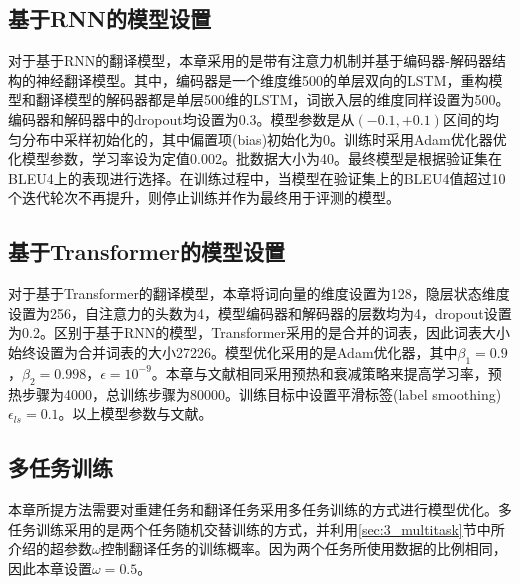 \subsection{基于RNN的模型设置}
\label{sec:3_rnn_setup}
对于基于RNN的翻译模型，本章采用的是带有注意力机制并基于编码器-解码器结构的神经翻译模型\cite{4_luong-etal-2015-effective}。其中，编码器是一个维度维500的单层双向的LSTM，重构模型和翻译模型的解码器都是单层500维的LSTM，词嵌入层的维度同样设置为500。编码器和解码器中的dropout均设置为0.3。模型参数是从$(-0.1,+0.1)$区间的均匀分布中采样初始化的，其中偏置项(bias)初始化为0。训练时采用Adam\cite{34_DBLP:journals/corr/KingmaB14}优化器优化模型参数，学习率设为定值0.002。批数据大小为40。最终模型是根据验证集在BLEU4\cite{42_papineni-etal-2002-bleu}上的表现进行选择。在训练过程中，当模型在验证集上的BLEU4值超过10个迭代轮次不再提升，则停止训练并作为最终用于评测的模型。

\subsection{基于Transformer的模型设置}
\label{sec:3_transformer_setup}
对于基于Transformer的翻译模型，本章将词向量的维度设置为128，隐层状态维度设置为256，自注意力的头数为4，模型编码器和解码器的层数均为4，dropout设置为0.2。区别于基于RNN的模型，Transformer采用的是合并的词表，因此词表大小始终设置为合并词表的大小27226。模型优化采用的是Adam优化器，其中$\beta_1=0.9$，$\beta_2=0.998$，$\epsilon=10^{-9}$。本章与文献\cite{5_DBLP:journals/corr/VaswaniSPUJGKP17}相同采用预热和衰减策略来提高学习率，预热步骤为4000，总训练步骤为80000。训练目标中设置平滑标签(label smoothing)$\epsilon_{ls}=0.1$。以上模型参数与文献\cite{33_yin-etal-2020-novel}。

\subsection{多任务训练}
本章所提方法需要对重建任务和翻译任务采用多任务训练的方式进行模型优化。多任务训练采用的是两个任务随机交替训练的方式，并利用\ref{sec:3_multitask}节中所介绍的超参数$\omega$控制翻译任务的训练概率。因为两个任务所使用数据的比例相同，因此本章设置$\omega=0.5$。

